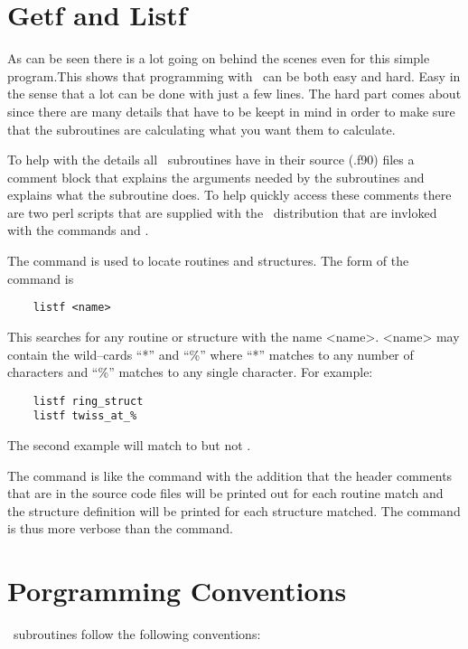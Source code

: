 \section{Getf and Listf}

As can be seen there is a lot going on behind the scenes even for this
simple program.This shows that programming with \bmad\ can be both easy
and hard. Easy in the sense that a lot can be done with just a few
lines. The hard part comes about since there are many details that
have to be keept in mind in order to make sure that the subroutines
are calculating what you want them to calculate.

To help with the details all \bmad\ subroutines have in their source (.f90)
files a comment block that explains the arguments needed by the
subroutines and explains what the subroutine does. To help quickly
access these comments there are two perl scripts that are supplied
with the \bmad\ distribution that are invloked with the commands
 and .

The  command is used to locate routines and structures.
The form of the command is
\begin{verbatim}
    listf <name>
\end{verbatim}
This searches for any routine or structure with the name
<name>. <name> may contain the wild--cards ``*'' and ``\%'' where
``*'' matches to any number of characters and ``\%'' matches to any
single character. For example:
\begin{verbatim}
    listf ring_struct
    listf twiss_at_%
\end{verbatim}
The second example will match to  but not
.

The  command is like the  command with the
addition that the header comments that are in the source code files
will be printed out for each routine match and the structure definition
will be printed for each structure matched. The  command is
thus more verbose than the  command.

\section{Porgramming Conventions}

\bmad\ subroutines follow the following conventions:

